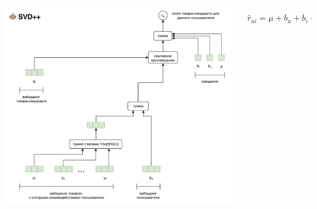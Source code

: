 \documentclass[11pt,aspectratio=169]{beamer}
\begin{document}
\begin{frame}

\begin{columns}
\begin{column}{0.47\textwidth}
\begin{center}
\includegraphics[scale=0.25]{images/svdpp.png}
\end{center}
\end{column}
\begin{column}{0.47\textwidth}
\begin{small}
\[
\hat r_{ui} = \mu + b_u + b_i + q_i^T \left( p_u + \frac{1}{\sqrt{|N(u)|}} \sum_j y_j \right)
\]
\end{small}
\end{column}
\end{columns}

\end{frame}
\end{document}
